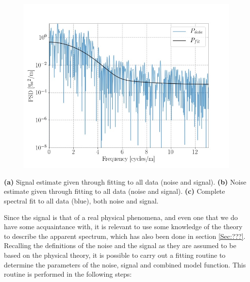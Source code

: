 \documentclass[../../CompleteThesis/Complete_1stDraft.tex]{subfiles}
\begin{document}
\begin{marginfigure}
	\begin{subfigure}{\marginparwidth}
		\centering
		\includegraphics[width=\textwidth]{SiteA_PSD_fit.jpg}
		\caption{\footnotesize}
		\label{fig:SiteA_PSD_fit}
	\end{subfigure}
	\caption[Isolated spectral fits, Site A]{\footnotesize\textbf{(a)} Signal estimate given through fitting to all data (noise and signal). \textbf{(b)} Noise estimate given through fitting to all data (noise and signal). \textbf{(c)} Complete spectral fit to all data (blue), both noise and signal.}
	\label{fig:SpectralFitsIsolated}
\end{marginfigure}
Since the signal is that of a real physical phenomena, and even one that we do have some acquaintance with, it is relevant to use some knowledge of the theory to describe the apparent spectrum, which has also been done in section \ref{Sec:???}. Recalling the definitions of the noise and the signal as they are assumed to be based on the physical theory, it is possible to carry out a fitting routine to determine the parameters of the noise, signal and combined model function. This routine is performed in the following steps:
\end{document}
